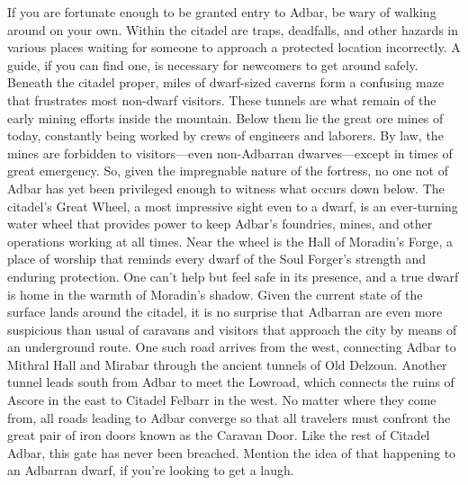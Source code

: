 \documentclass[10pt,a4paper,twoside,twocolumn,openany,bg=print,nodeprecatedcode]{dndbook}
\begin{document}
If you are fortunate enough to be granted entry to Adbar, be wary of walking around on your own. Within the citadel are traps, deadfalls, and other hazards in various places waiting for someone to approach a protected location incorrectly. A guide, if you can find one, is necessary for newcomers to get around safely.
Beneath the citadel proper, miles of dwarf-sized caverns form a confusing maze that frustrates most non-dwarf visitors. These tunnels are what remain of the early mining efforts inside the mountain. Below them lie the great ore mines of today, constantly being worked by crews of engineers and laborers.
By law, the mines are forbidden to visitors—even non-Adbarran dwarves—except in times of great emergency. So, given the impregnable nature of the fortress, no one not of Adbar has yet been privileged enough to witness what occurs down below. The citadel's Great Wheel, a most impressive sight even to a dwarf, is an ever-turning water wheel that provides power to keep Adbar's foundries, mines, and other operations working at all times. Near the wheel is the Hall of Moradin's Forge, a place of worship that reminds every dwarf of the Soul Forger's strength and enduring protection. One can't help but feel safe in its presence, and a true dwarf is home in the warmth of Moradin's shadow.
Given the current state of the surface lands around the citadel, it is no surprise that Adbarran are even more suspicious than usual of caravans and visitors that approach the city by means of an underground route. One such road arrives from the west, connecting Adbar to Mithral Hall and Mirabar through the ancient tunnels of Old Delzoun. Another tunnel leads south from Adbar to meet the Lowroad, which connects the ruins of Ascore in the east to Citadel Felbarr in the west.
No matter where they come from, all roads leading to Adbar converge so that all travelers must confront the great pair of iron doors known as the Caravan Door. Like the rest of Citadel Adbar, this gate has never been breached. Mention the idea of that happening to an Adbarran dwarf, if you're looking to get a laugh.
\end{document}
